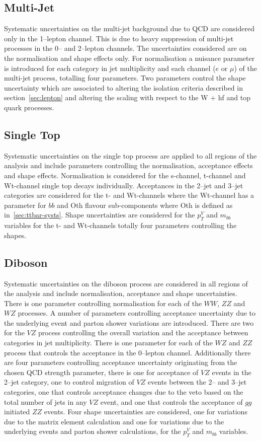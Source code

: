 \subsection{Multi-Jet}
Systematic uncertainties on the multi-jet background due to QCD are considered
only in the 1--lepton channel. This is due to heavy suppression of multi-jet
processes in the 0-- and 2--lepton channels. The uncertainties considered are on
the normalisation and shape effects only. For normalisation a nuisance parameter
is introduced for each category in jet multiplicity and each channel ($e$ or
$\mu$) of the multi-jet process, totalling four parameters. Two parameters
control the shape uncertainty which are associated to altering the isolation
criteria described in section~\ref{sec:lepton} and altering the scaling with
respect to the W + hf and top quark processes. 

\subsection{Single Top}
Systematic uncertainties on the single top process are applied to all regions of
the analysis and include parameters controlling the normalisation, acceptance
effects and shape effects. Normalisation is considered for the s-channel,
t-channel and Wt-channel single top decays individually. Acceptances in the
2--jet and 3--jet categories are considered for the t- and Wt-channels where the
Wt-channel has a parameter for $bb$ and Oth flavour sub-components where Oth is
defined as in~\ref{sec:ttbar-systs}. Shape uncertainties are considered for the
$p_T^V$ and $m_{bb}$ variables for the t- and Wt-channels totally four
parameters controlling the shapes.

\subsection{Diboson}
Systematic uncertainties on the diboson process are considered in all regions of
the analysis and include normalisation, acceptance and shape uncertainties.
There is one parameter controlling normalisation for each of the $WW$, $ZZ$ and
$WZ$ processes. A number of parameters controlling acceptance uncertainty due to
the underlying event and parton shower variations are introduced. There are two
for the $VZ$ process controlling the overall variation and the acceptance
between categories in jet multiplicity. There is one parameter for each of the
$WZ$ and $ZZ$ process that controls the acceptance in the 0--lepton channel.
Additionally there are four parameters controlling acceptance uncertainty
originating from the chosen QCD strength parameter, there is one for acceptance
of $VZ$ events in the 2--jet category, one to control migration of $VZ$ events
between the 2-- and 3--jet categories, one that controls acceptance changes due
to the veto based on the total number of jets in any $VZ$ event, and one that
controls the acceptance of $gg$ initiated $ZZ$ events. Four shape uncertainties
are considered, one for variations due to the matrix element calculation and one
for variations due to the underlying events and parton shower calculations, for
the $p_T^V$ and $m_{bb}$ variables.


